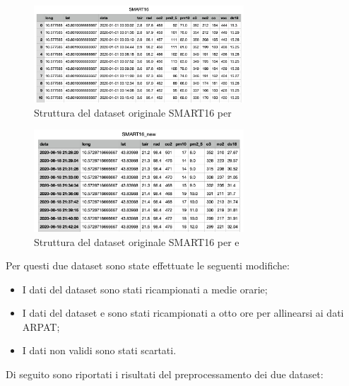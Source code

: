 \begin{figure}[H]
\centering
\captionsetup{justification=centering}
\includegraphics[width=0.7\textwidth,height=\textheight,keepaspectratio]{img/no2_smart_ds}
\caption{Struttura del dataset originale SMART16 per }
\label{fig:no2-smart-ds}
\end{figure}

\begin{figure}[H]
\centering
\captionsetup{justification=centering}
\includegraphics[width=0.7\textwidth,height=\textheight,keepaspectratio]{img/pm_smart_ds}
\caption{Struttura del dataset originale SMART16 per  e }
\label{fig:pm-smart-ds}
\end{figure}

Per questi due dataset sono state effettuate le seguenti modifiche:
\begin{itemize}
  \item I dati del dataset  sono stati ricampionati a medie orarie;
  \item I dati del dataset  e  sono stati ricampionati a otto ore per allinearsi ai dati ARPAT;
  \item I dati non validi sono stati scartati.
\end{itemize}
Di seguito sono riportati i risultati del preprocessamento dei due dataset:


